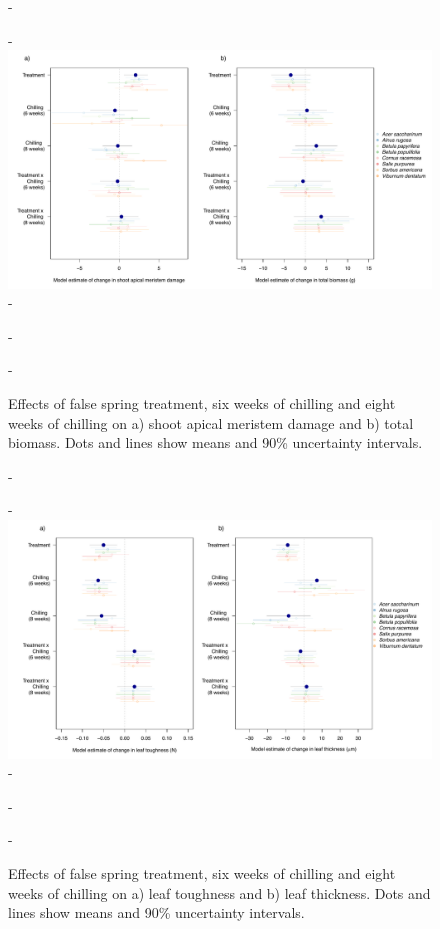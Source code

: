\documentclass{article}\usepackage[]{graphicx}\usepackage[]{color}
\begin{document}
  {\begin{figure} [H]
  -\begin{center}
  -\includegraphics[width=18cm]{..//analyses/figures/mu_growth90.pdf} 
  -\caption{Effects of false spring treatment, six weeks of chilling and eight weeks of chilling on a) shoot apical meristem damage and b) total biomass. Dots and lines show means and 90\% uncertainty intervals. }\label{fig:mugrowth}
  -\end{center}
  -\end{figure}}
  
  {\begin{figure} [H]
  -\begin{center}
  -\includegraphics[width=18cm]{..//analyses/figures/mu_leaftraits90.pdf} 
  -\caption{Effects of false spring treatment, six weeks of chilling and eight weeks of chilling on a) leaf toughness and b) leaf thickness. Dots and lines show means and 90\% uncertainty intervals. }\label{fig:muleaf}
  -\end{center}
  -\end{figure}}
  
\end{document}
